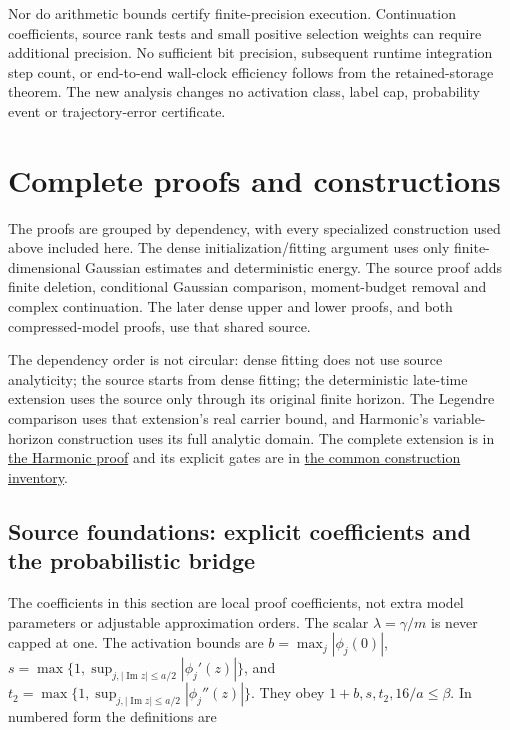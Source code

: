 
Nor do arithmetic bounds certify finite-precision execution. Continuation coefficients, source rank tests and small positive selection weights can require additional precision. No sufficient bit precision, subsequent runtime integration step count, or end-to-end wall-clock efficiency follows from the retained-storage theorem. The new analysis changes no activation class, label cap, probability event or trajectory-error certificate.


\section{Complete proofs and constructions}
\label{int:integrated-proofs}


The proofs are grouped by dependency, with every specialized construction used above included here. The dense initialization/fitting argument uses only finite-dimensional Gaussian estimates and deterministic energy. The source proof adds finite deletion, conditional Gaussian comparison, moment-budget removal and complex continuation. The later dense upper and lower proofs, and both compressed-model proofs, use that shared source.



The dependency order is not circular: dense fitting does not use source analyticity; the source starts from dense fitting; the deterministic late-time extension uses the source only through its original finite horizon. The Legendre comparison uses that extension's real carrier bound, and Harmonic's variable-horizon construction uses its full analytic domain. The complete extension is in \hyperref[int:harmonic-analytic-extension-proof]{the Harmonic proof} and its explicit gates are in \hyperref[int:harmonic-storage-count]{the common construction inventory}.


\subsection{Source foundations: explicit coefficients and the probabilistic bridge}
\label{int:source-foundations}


The coefficients in this section are local proof coefficients, not extra model parameters or adjustable approximation orders. The scalar \(\lambda=\gamma/m\) is never capped at one. The activation bounds are \(b=\max_j|\phi_j(0)|\), \(s=\max\{1,\allowbreak \sup_{j,\allowbreak |\operatorname{Im}z|\le a/2}|\phi_j'(z)|\}\), and \(t_2=\max\{1,\allowbreak \sup_{j,\allowbreak |\operatorname{Im}z|\le a/2}|\phi_j''(z)|\}\). They obey \(1+b,\allowbreak s,\allowbreak t_2,\allowbreak 16/a\le\beta\). In numbered form the definitions are


